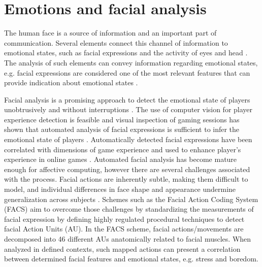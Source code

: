 \chapter{Emotions and facial analysis}
\label{ch:literature-face}

The human face is a source of information and an important part of communication. Several elements connect this channel of information to emotional states, such as facial expressions and the activity of eyes and head \parencite{akakin2010spatiotemporal}. The analysis of such elements can convey information regarding emotional states, e.g. facial expressions are considered one of the most relevant features that can provide indication about emotional states \parencite{cowie2001emotion}.

Facial analysis is a promising approach to detect the emotional state of players unobtrusively and without interruptions \parencite{cohn2014automated}. The use of computer vision for player experience detection is feasible and visual inspection of gaming sessions has shown that automated analysis of facial expressions is sufficient to infer the emotional state of players \parencite{tan2012feasibility,tan2014inferring}. Automatically detected facial expressions have been correlated with dimensions of game experience \parencite{tan2014correlation} and used to enhance player's experience in online games \parencite{zhou2004real,zhan2008real}. Automated facial analysis has become mature enough for affective computing, however there are several challenges associated with the process. Facial actions are inherently subtle, making them difficult to model, and individual differences in face shape and appearance undermine generalization across subjects \parencite{cohn2014automated}. Schemes such as the Facial Action Coding System (FACS) \parencite{ekman1977facial,cohn2007observer} aim to overcome those challenges by standardizing the measurements of facial expression by defining highly regulated procedural techniques to detect facial Action Units (AU). In the FACS scheme, facial actions/movements are decomposed into 46 different AUs anatomically related to facial muscles. When analyzed in defined contexts, such mapped actions can present a correlation between determined facial features and emotional states, e.g. stress and boredom.

